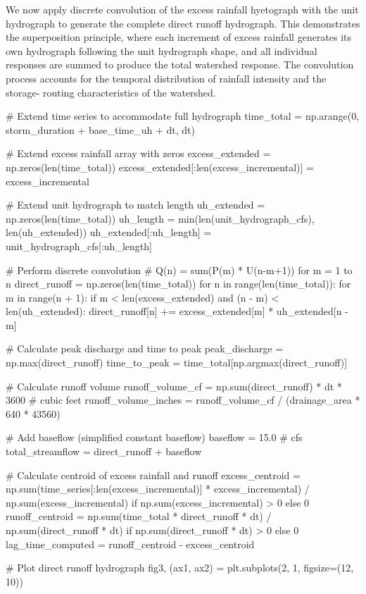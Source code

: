 \documentclass[a4paper, 11pt]{article}
\begin{document}
We now apply discrete convolution of the excess rainfall hyetograph with the unit hydrograph
to generate the complete direct runoff hydrograph. This demonstrates the superposition principle,
where each increment of excess rainfall generates its own hydrograph following the unit hydrograph
shape, and all individual responses are summed to produce the total watershed response. The
convolution process accounts for the temporal distribution of rainfall intensity and the storage-
routing characteristics of the watershed.

\begin{pycode}
# Extend time series to accommodate full hydrograph
time_total = np.arange(0, storm_duration + base_time_uh + dt, dt)

# Extend excess rainfall array with zeros
excess_extended = np.zeros(len(time_total))
excess_extended[:len(excess_incremental)] = excess_incremental

# Extend unit hydrograph to match length
uh_extended = np.zeros(len(time_total))
uh_length = min(len(unit_hydrograph_cfs), len(uh_extended))
uh_extended[:uh_length] = unit_hydrograph_cfs[:uh_length]

# Perform discrete convolution
# Q(n) = sum(P(m) * U(n-m+1)) for m = 1 to n
direct_runoff = np.zeros(len(time_total))
for n in range(len(time_total)):
    for m in range(n + 1):
        if m < len(excess_extended) and (n - m) < len(uh_extended):
            direct_runoff[n] += excess_extended[m] * uh_extended[n - m]

# Calculate peak discharge and time to peak
peak_discharge = np.max(direct_runoff)
time_to_peak = time_total[np.argmax(direct_runoff)]

# Calculate runoff volume
runoff_volume_cf = np.sum(direct_runoff) * dt * 3600  # cubic feet
runoff_volume_inches = runoff_volume_cf / (drainage_area * 640 * 43560)

# Add baseflow (simplified constant baseflow)
baseflow = 15.0  # cfs
total_streamflow = direct_runoff + baseflow

# Calculate centroid of excess rainfall and runoff
excess_centroid = np.sum(time_series[:len(excess_incremental)] * excess_incremental) / np.sum(excess_incremental) if np.sum(excess_incremental) > 0 else 0
runoff_centroid = np.sum(time_total * direct_runoff * dt) / np.sum(direct_runoff * dt) if np.sum(direct_runoff * dt) > 0 else 0
lag_time_computed = runoff_centroid - excess_centroid

# Plot direct runoff hydrograph
fig3, (ax1, ax2) = plt.subplots(2, 1, figsize=(12, 10))


\end{pycode}
\end{document}

